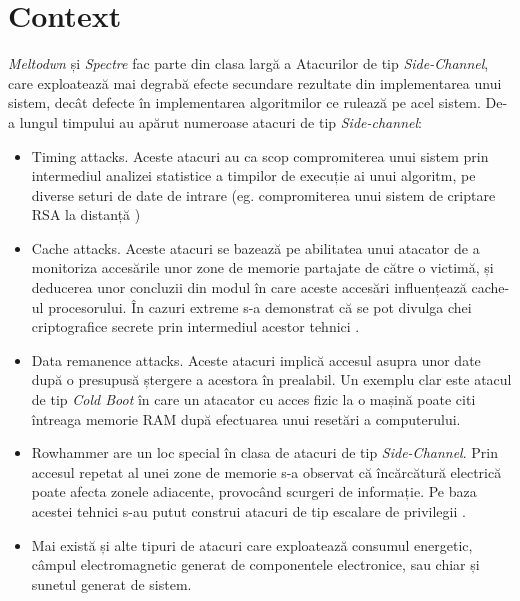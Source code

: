 \section*{Context}

\emph{Meltodwn} și \emph{Spectre} fac parte din clasa largă a Atacurilor de tip
\emph{Side-Channel}, care exploatează mai degrabă efecte secundare rezultate
din implementarea unui sistem, decât defecte în implementarea algoritmilor ce
rulează pe acel sistem. De-a lungul timpului au apărut numeroase atacuri de tip
\emph{Side-channel}:

\begin{itemize}
  \item Timing attacks. Aceste atacuri au ca scop compromiterea unui sistem prin
    intermediul analizei statistice a timpilor de execuție ai unui algoritm, pe   
    diverse seturi de date de intrare (eg. compromiterea unui sistem de criptare
    RSA la distanță \cite{timing_practical})
  \item Cache attacks. Aceste atacuri se bazează pe abilitatea unui atacator de
    a monitoriza accesările unor zone de memorie partajate de către o victimă,
    și deducerea unor concluzii din modul în care aceste accesări influențează
    cache-ul procesorului. În cazuri extreme s-a demonstrat că se pot divulga
    chei criptografice secrete prin intermediul acestor tehnici
    \cite{percival2005cache}.
  \item Data remanence attacks. Aceste atacuri implică accesul asupra unor date
    după o presupusă ștergere a acestora în prealabil. Un exemplu clar este 
    atacul de tip \emph{Cold Boot} \cite{cold_boot} în care un atacator cu
    acces fizic la o mașină poate citi întreaga memorie RAM după efectuarea
    unui resetări a computerului.
  \item Rowhammer are un loc special în clasa de atacuri de tip \emph{Side-Channel}. 
    Prin accesul repetat al unei zone de memorie s-a observat că încărcătură electrică
    poate afecta zonele adiacente, provocând scurgeri de informație. Pe baza acestei
    tehnici s-au putut construi atacuri de tip escalare de privilegii \cite{rowhammer}.
  \item Mai există și alte tipuri de atacuri care exploatează consumul energetic,
    câmpul electromagnetic generat de componentele electronice, sau chiar și sunetul
    generat de sistem.
\end{itemize}


